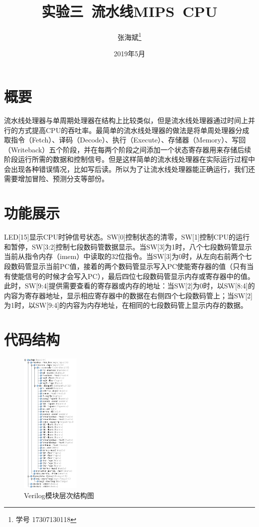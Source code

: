 \documentclass[12pt,a4paper]{article}
\title{实验三~流水线MIPS~CPU}
\author{张海斌\thanks{学号 17307130118}}
\begin{document}
\date{2019年5月}

\maketitle

\renewcommand\contentsname{目~录}
\tableofcontents

\section{概要}

流水线处理器与单周期处理器在结构上比较类似，但是流水线处理器通过时间上并行的方式提高CPU的吞吐率。最简单的流水线处理器的做法是将单周处理器分成取指令（Fetch）、译码（Decode）、执行（Execute）、存储器（Memory）、写回（Writeback）五个阶段，并在每两个阶段之间添加一个状态寄存器用来存储后续阶段运行所需的数据和控制信号。但是这样简单的流水线处理器在实际运行过程中会出现各种错误情况，比如写后读。所以为了让流水线处理器能正确运行，我们还需要增加冒险、预测分支等部份。

\section{功能展示}

LED[15]显示CPU时钟信号状态。SW[0]控制状态的清零，SW[1]控制CPU的运行和暂停，SW[3:2]控制七段数码管数据显示。当SW[3]为1时，八个七段数码管显示当前从指令内存（imem）中读取的32位指令。当SW[3]为0时，从左向右前两个七段数码管显示当前PC值，接着的两个数码管显示写入PC使能寄存器的值（只有当有使能信号的时候才会写入PC），最后四位七段数码管显示内存或寄存器中的值。此时，SW[9:4]提供需要查看的寄存器或内存的地址：当SW[2]为0时，以SW[8:4]的内容为寄存器地址，显示相应寄存器中的数据在右侧四个七段数码管上；当SW[2]为1时，以SW[9:4]的内容为内存地址，在相同的七段数码管上显示内存的数据。

\section{代码结构}

\begin{figure}[htbp]
	\centering
	\includegraphics[width=0.25\textwidth]{struct}
	\caption{Verilog模块层次结构图}
	\label{fig:struct}
\end{figure}
\end{document}

